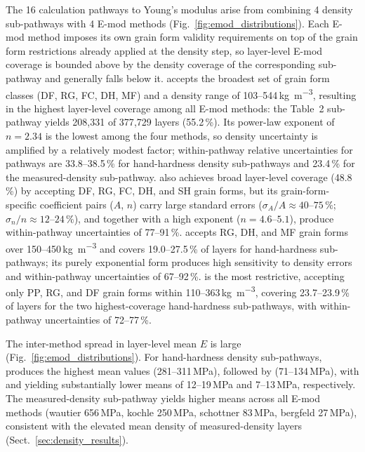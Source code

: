 \documentclass[hess, manuscript]{copernicus}
\begin{document}
The 16 calculation pathways to Young's modulus arise from combining 4 density sub-pathways with 4 E-mod methods (Fig.~\ref{fig:emod_distributions}). Each E-mod method imposes its own grain form validity requirements on top of the grain form restrictions already applied at the density step, so layer-level E-mod coverage is bounded above by the density coverage of the corresponding sub-pathway and generally falls below it. \citet{wautier2015} accepts the broadest set of grain form classes (DF, RG, FC, DH, MF) and a density range of 103--544\,\si{kg.m^{-3}}, resulting in the highest layer-level coverage among all E-mod methods: the \citeauthor{kimjamieson2009} Table~2 sub-pathway yields 208{,}331 of 377{,}729 layers (55.2\,\%). Its power-law exponent of $n = 2.34$ is the lowest among the four methods, so density uncertainty is amplified by a relatively modest factor; within-pathway relative uncertainties for \citeauthor{wautier2015} pathways are 33.8--38.5\,\% for hand-hardness density sub-pathways and 23.4\,\% for the measured-density sub-pathway. \citet{schottner2026} also achieves broad layer-level coverage (48.8\,\%) by accepting DF, RG, FC, DH, and SH grain forms, but its grain-form-specific coefficient pairs ($A$, $n$) carry large standard errors ($\sigma_A/A \approx 40$--$75\,\%$; $\sigma_n/n \approx 12$--$24\,\%$), and together with a high exponent ($n = 4.6$--$5.1$), produce within-pathway uncertainties of 77--91\,\%. \citet{kochle2014} accepts RG, DH, and MF grain forms over 150--450\,\si{kg.m^{-3}} and covers 19.0--27.5\,\% of layers for hand-hardness sub-pathways; its purely exponential form produces high sensitivity to density errors and within-pathway uncertainties of 67--92\,\%. \citet{bergfeld2023} is the most restrictive, accepting only PP, RG, and DF grain forms within 110--363\,\si{kg.m^{-3}}, covering 23.7--23.9\,\% of layers for the two highest-coverage hand-hardness sub-pathways, with within-pathway uncertainties of 72--77\,\%.

The inter-method spread in layer-level mean $E$ is large (Fig.~\ref{fig:emod_distributions}). For hand-hardness density sub-pathways, \citeauthor{wautier2015} produces the highest mean values (281--311\,\si{MPa}), followed by \citeauthor{kochle2014} (71--134\,\si{MPa}), with \citeauthor{schottner2026} and \citeauthor{bergfeld2023} yielding substantially lower means of 12--19\,\si{MPa} and 7--13\,\si{MPa}, respectively. The measured-density sub-pathway yields higher means across all E-mod methods (wautier 656\,\si{MPa}, kochle 250\,\si{MPa}, schottner 83\,\si{MPa}, bergfeld 27\,\si{MPa}), consistent with the elevated mean density of measured-density layers (Sect.~\ref{sec:density_results}).
\end{document}
